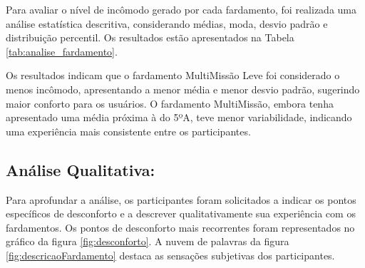         Para avaliar o nível de incômodo gerado por cada fardamento, foi realizada uma análise 
        estatística descritiva, considerando médias, moda, desvio padrão e distribuição percentil. Os resultados 
        estão apresentados na Tabela \ref{tab:analise_fardamento}.

        \begin{table}[H]
    \centering
    \caption{Análise Quantitativa do Grau de Incômodo por Fardamento}
    \label{tab:analise_fardamento}
\end{table}

    

        Os resultados indicam que o fardamento MultiMissão Leve foi considerado o menos incômodo, 
        apresentando a menor média e menor desvio padrão, sugerindo maior conforto para os usuários. 
        O fardamento MultiMissão, embora tenha apresentado uma média próxima à do 5ºA, teve menor 
        variabilidade, indicando uma experiência mais consistente entre os participantes.
            


 
    \subsection{ Análise Qualitativa:}
        Para aprofundar a análise, os participantes foram solicitados a indicar os pontos específicos 
        de desconforto e a descrever qualitativamente sua experiência com os fardamentos. Os pontos 
        de desconforto mais recorrentes foram representados no gráfico da figura \ref{fig:desconforto}. 
        A nuvem de palavras da figura \ref{fig:descricaoFardamento} destaca as sensações subjetivas 
        dos participantes. 
        
